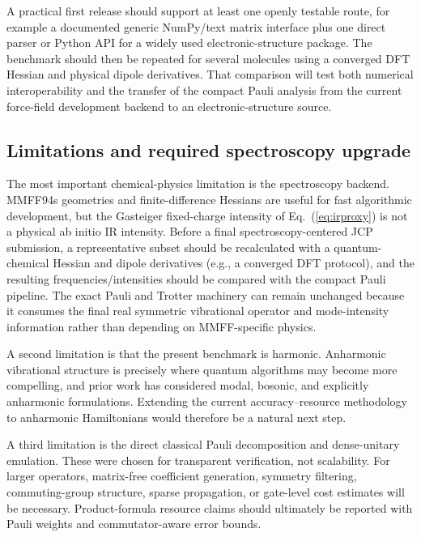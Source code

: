 \documentclass[aip,jcp,reprint,amsmath,amssymb,floatfix]{revtex4-2}
\begin{document}
A practical first release should support at least one openly testable route, for example a documented generic NumPy/text matrix interface plus one direct parser or Python API for a widely used electronic-structure package. The benchmark should then be repeated for several molecules using a converged DFT Hessian and physical dipole derivatives. That comparison will test both numerical interoperability and the transfer of the compact Pauli analysis from the current force-field development backend to an electronic-structure source.

\subsection{Limitations and required spectroscopy upgrade}
\label{sec:limitations}
The most important chemical-physics limitation is the spectroscopy backend. MMFF94s geometries and finite-difference Hessians are useful for fast algorithmic development,\cite{Halgren1996} but the Gasteiger fixed-charge intensity of Eq.~(\ref{eq:irproxy}) is not a physical ab initio IR intensity. Before a final spectroscopy-centered JCP submission, a representative subset should be recalculated with a quantum-chemical Hessian and dipole derivatives (e.g., a converged DFT protocol), and the resulting frequencies/intensities should be compared with the compact Pauli pipeline. The exact Pauli and Trotter machinery can remain unchanged because it consumes the final real symmetric vibrational operator and mode-intensity information rather than depending on MMFF-specific physics.

A second limitation is that the present benchmark is harmonic. Anharmonic vibrational structure is precisely where quantum algorithms may become more compelling, and prior work has considered modal, bosonic, and explicitly anharmonic formulations.\cite{Ollitrault2020,Sawaya2021,Trenev2025,Malpathak2026} Extending the current accuracy--resource methodology to anharmonic Hamiltonians would therefore be a natural next step.

A third limitation is the direct classical Pauli decomposition and dense-unitary emulation. These were chosen for transparent verification, not scalability. For larger operators, matrix-free coefficient generation, symmetry filtering, commuting-group structure, sparse propagation, or gate-level cost estimates will be necessary. Product-formula resource claims should ultimately be reported with Pauli weights and commutator-aware error bounds.\cite{Childs2021,Trenev2025,Malpathak2026}
\end{document}
